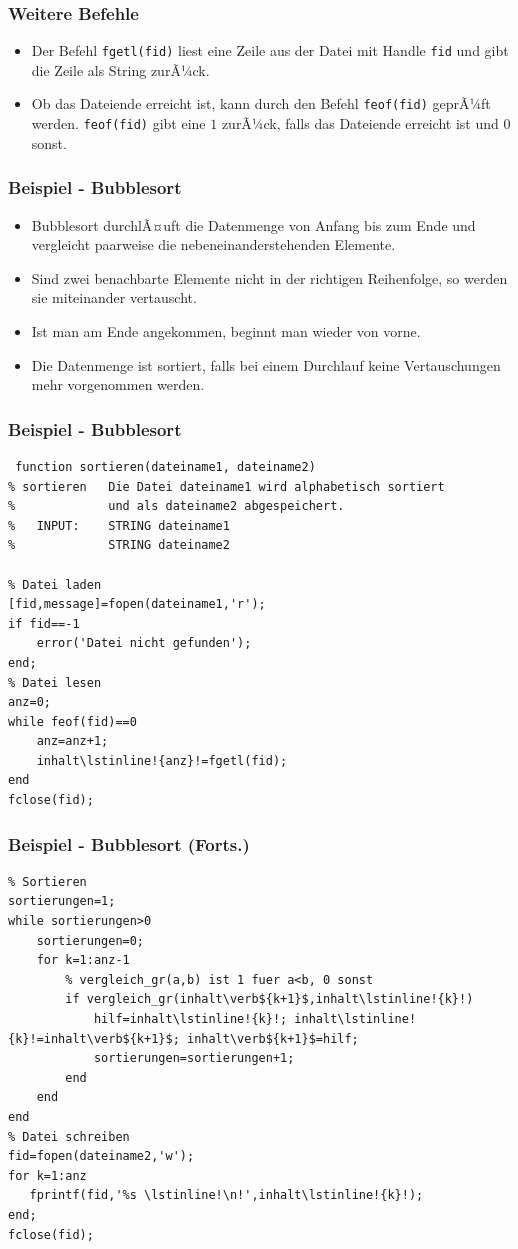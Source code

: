 %
%
\begin{frame}[fragile]\frametitle{Weitere Befehle}
\begin{itemize}
\item Der Befehl \alert{ \lstinline!fgetl(fid)!} liest eine Zeile aus der Datei mit
  Handle \lstinline!fid! und gibt die Zeile als String zurÃ¼ck.
\item Ob das Dateiende erreicht ist, kann durch den Befehl \alert{
  \lstinline!feof(fid)!} geprÃ¼ft werden. \lstinline!feof(fid)! gibt eine $1$
  zurÃ¼ck, falls das Dateiende erreicht ist und $0$ sonst. 
\end{itemize}
\end{frame}
%
%
\begin{frame}[fragile]\frametitle{Beispiel - Bubblesort}
\vspace*{-0.5cm}
\begin{itemize}
\item Bubblesort durchlÃ¤uft die Datenmenge von Anfang bis zum Ende und
vergleicht paarweise die nebeneinanderstehenden Elemente. 
\item Sind zwei
benachbarte Elemente nicht in der richtigen Reihenfolge, so werden sie
miteinander vertauscht. 
\item Ist man am Ende angekommen, beginnt man wieder
von vorne. 
\item Die Datenmenge ist sortiert, falls bei einem Durchlauf
keine Vertauschungen mehr vorgenommen werden.
\end{itemize} 
\end{frame}
%
%
\begin{frame}[fragile]\frametitle{Beispiel - Bubblesort}
\begin{lstlisting}
 function sortieren(dateiname1, dateiname2)
% sortieren   Die Datei dateiname1 wird alphabetisch sortiert
%             und als dateiname2 abgespeichert.
%   INPUT:    STRING dateiname1
%             STRING dateiname2
 
% Datei laden
[fid,message]=fopen(dateiname1,'r');
if fid==-1 
    error('Datei nicht gefunden');
end;
% Datei lesen
anz=0;
while feof(fid)==0
    anz=anz+1;     
    inhalt\lstinline!{anz}!=fgetl(fid); 
end
fclose(fid);
\end{lstlisting}
\end{frame}
%
%
\begin{frame}[fragile]\frametitle{Beispiel - Bubblesort (Forts.)}
\begin{lstlisting}
% Sortieren
sortierungen=1; 
while sortierungen>0
    sortierungen=0;
    for k=1:anz-1
        % vergleich_gr(a,b) ist 1 fuer a<b, 0 sonst
        if vergleich_gr(inhalt\verb${k+1}$,inhalt\lstinline!{k}!)
            hilf=inhalt\lstinline!{k}!; inhalt\lstinline!{k}!=inhalt\verb${k+1}$; inhalt\verb${k+1}$=hilf;
            sortierungen=sortierungen+1;
        end
    end
end
% Datei schreiben
fid=fopen(dateiname2,'w');
for k=1:anz
   fprintf(fid,'%s \lstinline!\n!',inhalt\lstinline!{k}!); 
end;
fclose(fid);
\end{lstlisting}
\end{frame}

